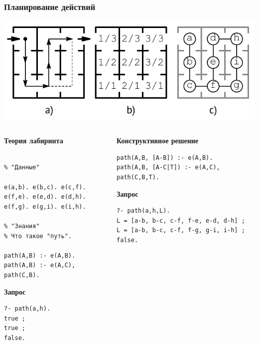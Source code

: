 \documentclass[10pt]{beamer}
\begin{document}
\begin{frame}[fragile]
  \frametitle{Планирование действий}
  \begin{center}
    \includegraphics[width=0.7\linewidth]{pics/maze.pdf}
  \end{center}
\begin{columns}
  \begin{column}{0.5\textwidth}
  \textbf{Теория лабиринта}
\begin{verbatim}

% "Данные"

e(a,b). e(b,c). e(c,f).
e(f,e). e(e,d). e(d,h).
e(f,g). e(g,i). e(i,h).

% "Знания"
% Что такое "путь".

path(A,B) :- e(A,B).
path(A,B) :- e(A,C), path(C,B).

\end{verbatim}

  \noindent\textbf{Запрос}

\begin{verbatim}
?- path(a,h).
true ;
true ;
false.
\end{verbatim}
\end{column}
\begin{column}{0.5\textwidth}
\textbf{Конструктивное решение}
\begin{verbatim}
path(A,B, [A-B]) :- e(A,B).
path(A,B, [A-C|T]) :- e(A,C), path(C,B,T).
\end{verbatim}
\textbf{Запрос}
\begin{verbatim}
?- path(a,h,L).
L = [a-b, b-c, c-f, f-e, e-d, d-h] ;
L = [a-b, b-c, c-f, f-g, g-i, i-h] ;
false.
\end{verbatim}
\vspace{4em}
\mbox{}
\end{column}
\end{columns}
\end{frame}
\end{document}
